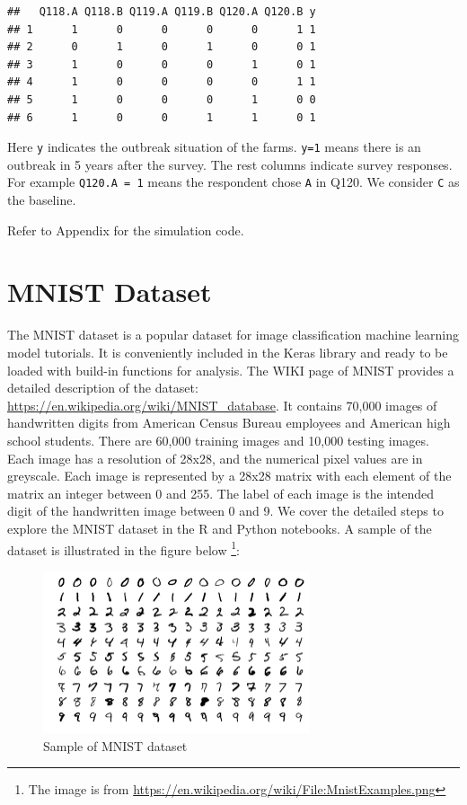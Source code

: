 \documentclass[
  12pt,
]{krantz}
\begin{document}
\begin{verbatim}
##   Q118.A Q118.B Q119.A Q119.B Q120.A Q120.B y
## 1      1      0      0      0      0      1 1
## 2      0      1      0      1      0      0 1
## 3      1      0      0      0      1      0 1
## 4      1      0      0      0      0      1 1
## 5      1      0      0      0      1      0 0
## 6      1      0      0      1      1      0 1
\end{verbatim}

Here \texttt{y} indicates the outbreak situation of the farms. \texttt{y=1} means there is an outbreak in 5 years after the survey. The rest columns indicate survey responses. For example \texttt{Q120.A\ =\ 1} means the respondent chose \texttt{A} in Q120. We consider \texttt{C} as the baseline.

Refer to Appendix for the simulation code.

\hypertarget{mnist-dataset}{%
\section{MNIST Dataset}\label{mnist-dataset}}

The MNIST dataset is a popular dataset for image classification machine learning model tutorials. It is conveniently included in the Keras library and ready to be loaded with build-in functions for analysis. The WIKI page of MNIST provides a detailed description of the dataset: \url{https://en.wikipedia.org/wiki/MNIST_database}. It contains 70,000 images of handwritten digits from American Census Bureau employees and American high school students. There are 60,000 training images and 10,000 testing images. Each image has a resolution of 28x28, and the numerical pixel values are in greyscale. Each image is represented by a 28x28 matrix with each element of the matrix an integer between 0 and 255. The label of each image is the intended digit of the handwritten image between 0 and 9. We cover the detailed steps to explore the MNIST dataset in the R and Python notebooks. A sample of the dataset is illustrated in the figure below \footnote{The image is from \url{https://en.wikipedia.org/wiki/File:MnistExamples.png}}:

\begin{figure}
\centering
\includegraphics[width=0.7\textwidth,height=\textheight]{images/MnistExamples.png}
\caption{Sample of MNIST dataset}
\end{figure}
\end{document}
